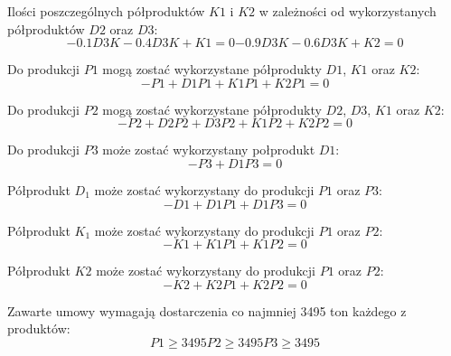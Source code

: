 \documentclass[a4paper,10pt,fleqn]{article}
\begin{document}
		Ilości poszczególnych półproduktów $K1$ i $K2$ w zależności od wykorzystanych półproduktów $D2$ oraz $D3$:
		\begin{subequations}
			\begin{equation}
				-0.1D3K -0.4D3K + K1 = 0
			\end{equation}
			\begin{equation}
				-0.9D3K -0.6D3K + K2 = 0
			\end{equation}
		\end{subequations}

		Do produkcji $P1$ mogą zostać wykorzystane półprodukty $D1$, $K1$ oraz $K2$:
		\begin{equation}
			-P1 + D1P1 + K1P1 + K2P1 = 0 
		\end{equation}

		Do produkcji $P2$ mogą zostać wykorzystane półprodukty $D2$, $D3$, $K1$ oraz $K2$:
		\begin{equation}
			-P2 + D2P2 + D3P2 + K1P2 + K2P2 = 0 
		\end{equation}

		Do produkcji $P3$ może zostać wykorzystany połprodukt $D1$:
		\begin{equation}
			-P3 + D1P3 = 0 
		\end{equation}

		Półprodukt $D_1$ może zostać wykorzystany do produkcji $P1$ oraz $P3$:
		\begin{equation}
			-D1 + D1P1 + D1P3 = 0
		\end{equation}

		Półprodukt $K_1$ może zostać wykorzystany do produkcji $P1$ oraz $P2$:
		\begin{equation}
			-K1 + K1P1 + K1P2 = 0
		\end{equation}

		Półprodukt $K2$ może zostać wykorzystany do produkcji $P1$ oraz $P2$:
		\begin{equation}
			-K2 + K2P1 + K2P2 = 0
		\end{equation}

		Zawarte umowy wymagają dostarczenia co najmniej 3495 ton każdego z produktów:
		\begin{subequations}
			\begin{equation}
				P1 \geq 3495
			\end{equation}
			\begin{equation}
				P2 \geq 3495
			\end{equation}
			\begin{equation}
				P3 \geq 3495
			\end{equation}
		\end{subequations}
\end{document}
